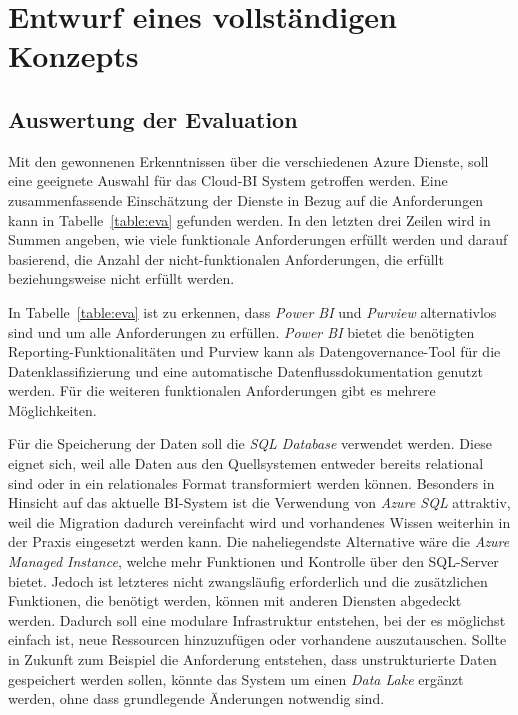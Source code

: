 \section{Entwurf eines vollständigen Konzepts} \label{sec:entwurfBIArchitektur}

\subsection{Auswertung der Evaluation} \label{sec:konzeption:evaAuswertung}
Mit den gewonnenen Erkenntnissen über die verschiedenen Azure Dienste, soll eine geeignete Auswahl für das Cloud-BI System getroffen werden. Eine zusammenfassende Einschätzung der Dienste in Bezug auf die Anforderungen kann in Tabelle~\ref{table:eva} gefunden werden. In den letzten drei Zeilen wird in Summen angeben, wie viele funktionale Anforderungen erfüllt werden und darauf basierend, die Anzahl der nicht-funktionalen Anforderungen, die erfüllt beziehungsweise nicht erfüllt werden.



















In Tabelle~\ref{table:eva} ist zu erkennen, dass \textit{Power BI} und \textit{Purview} alternativlos sind und um alle Anforderungen zu erfüllen. \textit{Power BI} bietet die benötigten Reporting-Funktionalitäten und Purview kann als Datengovernance-Tool für die Datenklassifizierung und eine automatische Datenflussdokumentation genutzt werden. Für die weiteren funktionalen Anforderungen gibt es mehrere Möglichkeiten. 

Für die Speicherung der Daten soll die \textit{SQL Database} verwendet werden. Diese eignet sich, weil alle Daten aus den Quellsystemen entweder bereits relational sind oder in ein relationales Format transformiert werden können. Besonders in Hinsicht auf das aktuelle BI-System ist die Verwendung von \textit{Azure SQL} attraktiv, weil die Migration dadurch vereinfacht wird und vorhandenes Wissen weiterhin in der Praxis eingesetzt werden kann. Die naheliegendste Alternative wäre die \textit{Azure Managed Instance}, welche mehr Funktionen und Kontrolle über den SQL-Server bietet. Jedoch ist letzteres nicht zwangsläufig erforderlich und die zusätzlichen Funktionen, die benötigt werden, können mit anderen Diensten abgedeckt werden. Dadurch soll eine modulare Infrastruktur entstehen, bei der es möglichst einfach ist, neue Ressourcen hinzuzufügen oder vorhandene auszutauschen. Sollte in Zukunft zum Beispiel die Anforderung entstehen, dass unstrukturierte Daten gespeichert werden sollen, könnte das System um einen \textit{Data Lake} ergänzt werden, ohne dass grundlegende Änderungen notwendig sind.

